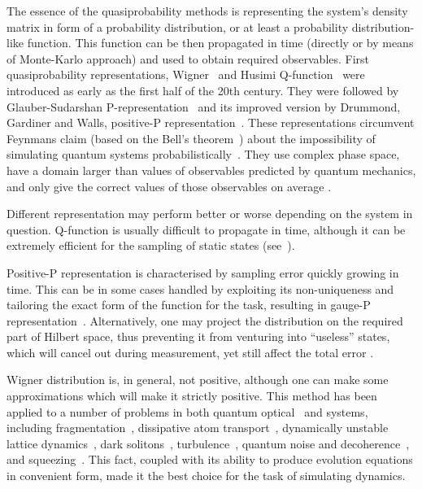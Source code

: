 The essence of the quasiprobability methods is representing the system's density matrix in form of a probability distribution, or at least a probability distribution-like function.
This function can be then propagated in time (directly or by means of Monte-Karlo approach) and used to obtain required observables.
First quasiprobability representations, Wigner~\cite{Wigner1932,Dirac1945,Moyal1947} and Husimi Q-function~\cite{Husimi1940} were introduced as early as the first half of the 20th century.
They were followed by Glauber-Sudarshan P-representation~\cite{Sudarshan1963,Glauber1963b,Glauber1963} and its improved version by Drummond, Gardiner and Walls, positive-P representation~\cite{Drummond1980,Drummond1981}.
These representations circumvent Feynmans claim (based on the Bell's theorem~\cite{Bell1964}) about the impossibility of simulating quantum systems probabilistically~\cite{Feynman1982}.
They use complex phase space, have a domain larger than values of observables predicted by quantum mechanics, and only give the correct values of those observables on average .

Different representation may perform better or worse depending on the system in question.
Q-function is usually difficult to propagate in time, although it can be extremely efficient for the sampling of static states (see~).

Positive-P representation is characterised by sampling error quickly growing in time.
This can be in some cases handled by exploiting its non-uniqueness and tailoring the exact form of the function for the task, resulting in gauge-P representation~\cite{Deuar2002}.
Alternatively, one may project the distribution on the required part of Hilbert space, thus preventing it from venturing into ``useless'' states, which will cancel out during measurement, yet still affect the total error .

Wigner distribution is, in general, not positive, although one can make some approximations which will make it strictly positive.
This method has been applied to a number of problems in both quantum optical~\cite{Drummond1993,Drummond1993a,Corney2008,Corney2006} and  systems, including fragmentation~\cite{Isella2006,Isella2005,Gross2011}, dissipative atom transport~\cite{Ruostekoski2005}, dynamically unstable lattice dynamics~\cite{Shrestha2009}, dark solitons~\cite{Martin2010,Martin2010a}, turbulence~\cite{Norrie2005,Norrie2006a}, quantum noise and decoherence~\cite{Steel1998,Egorov2011}, and squeezing~\cite{Opanchuk2012,Opanchuk2012a}.
This fact, coupled with its ability to produce evolution equations in convenient form, made it the best choice for the task of simulating  dynamics.

